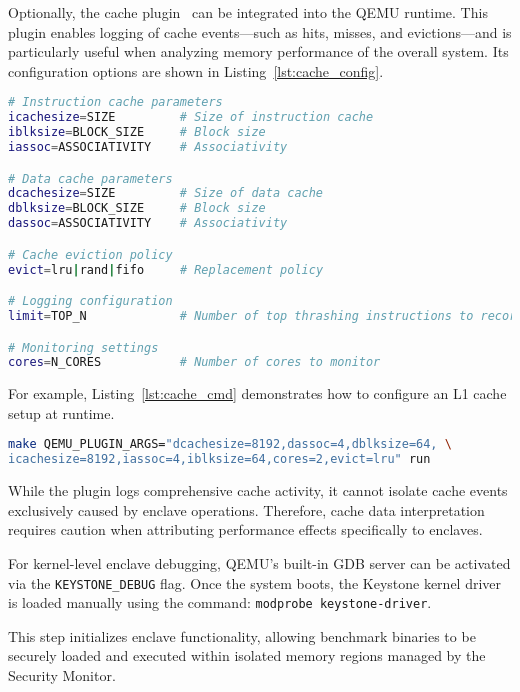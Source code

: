Optionally, the cache plugin~\cite{mandour2021cache} can be integrated into the QEMU runtime. This plugin enables logging of cache events—such as hits, misses, and evictions—and is particularly useful when analyzing memory performance of the overall system. Its configuration options are shown in Listing~\ref{lst:cache_config}.
\begin{lstlisting}[language=bash,caption={Configuration options for cache simulation},label={lst:cache_config}]
# Instruction cache parameters
icachesize=SIZE         # Size of instruction cache
iblksize=BLOCK_SIZE     # Block size
iassoc=ASSOCIATIVITY    # Associativity

# Data cache parameters
dcachesize=SIZE         # Size of data cache
dblksize=BLOCK_SIZE     # Block size
dassoc=ASSOCIATIVITY    # Associativity

# Cache eviction policy
evict=lru|rand|fifo     # Replacement policy

# Logging configuration
limit=TOP_N             # Number of top thrashing instructions to record

# Monitoring settings
cores=N_CORES           # Number of cores to monitor
\end{lstlisting}


For example, Listing~\ref{lst:cache_cmd} demonstrates how to configure an L1 cache setup at runtime.

\begin{lstlisting}[language=bash, caption={Configuration command for cache plugin}, label={lst:cache_cmd}]
make QEMU_PLUGIN_ARGS="dcachesize=8192,dassoc=4,dblksize=64, \
icachesize=8192,iassoc=4,iblksize=64,cores=2,evict=lru" run
\end{lstlisting}

While the plugin logs comprehensive cache activity, it cannot isolate cache events exclusively caused by enclave operations. Therefore, cache data interpretation requires caution when attributing performance effects specifically to enclaves.

For kernel-level enclave debugging, QEMU’s built-in GDB server can be activated via the \texttt{KEYSTONE\_DEBUG} flag. Once the system boots, the Keystone kernel driver is loaded manually using the command: \texttt{modprobe keystone-driver}.

This step initializes enclave functionality, allowing benchmark binaries to be securely loaded and executed within isolated memory regions managed by the Security Monitor.

